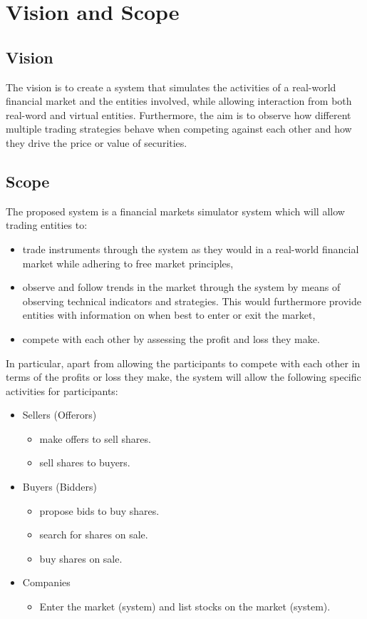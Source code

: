 \documentclass[12pt]{article}
\begin{document}
	\newpage
	\tableofcontents
				  
		\newpage
			\section{Vision and Scope}
				\subsection{Vision}
				The vision is to create a system that simulates the activities of a real-world financial market and the entities involved, while allowing interaction from both real-word and virtual entities. Furthermore, the aim is to observe how different multiple trading strategies behave when competing against each other and how they drive the price or value of securities.
				
				\subsection{Scope}
				The proposed system is a financial markets simulator system which will allow trading entities to:
				\begin{itemize}
				\item trade instruments through the system as they would in a real-world financial market while adhering to free market principles,
				\item observe and follow trends in the market through the system by means of observing technical indicators and strategies. This would furthermore provide entities with information on when best to enter or exit the market,
				\item compete with each other by assessing the profit and loss they make.
				\end{itemize}
				
				In particular, apart from allowing the participants to compete with each other in terms of the profits or loss they make, the system will allow the following specific activities for participants:
				
				\begin{itemize}
				\item Sellers (Offerors)
					\begin{itemize}
					\item make offers to sell shares.
					\item sell shares to buyers.
					\end{itemize}
				\item Buyers (Bidders)
					\begin{itemize}
					\item propose bids to buy shares.
					\item search for shares on sale.
					\item buy shares on sale.
					\end{itemize}
				\item Companies
					\begin{itemize}
					\item Enter the market (system) and list stocks on the market (system).
					\end{itemize}
				
				\end{itemize}
\end{document}
